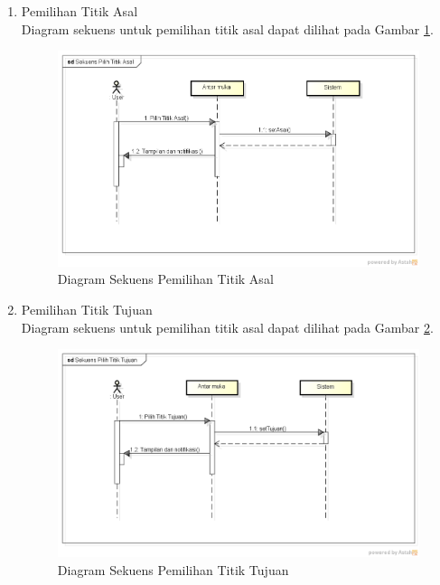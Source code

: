 \begin{enumerate}
  \item Pemilihan Titik Asal\\
  Diagram sekuens untuk pemilihan titik asal dapat dilihat pada Gambar
  \ref{fig:sd_titikAsal}.
\begin{figure}[h]
\centering
\includegraphics[scale=0.5]{Gambar/sd_titikAsal}
\caption[Diagram Sekuens Pemilihan Titik Asal]{Diagram Sekuens Pemilihan Titik
Asal}
\label{fig:sd_titikAsal}
\end{figure}
  
  \item Pemilihan Titik Tujuan\\
  Diagram sekuens untuk pemilihan titik asal dapat dilihat pada Gambar
  \ref{fig:sd_titikTujuan}.
\begin{figure}[H]
\centering
\includegraphics[scale=0.5]{Gambar/sd_titikTujuan}
\caption[Diagram Sekuens Pemilihan Titik Tujuan]{Diagram Sekuens Pemilihan Titik
Tujuan}
\label{fig:sd_titikTujuan}
\end{figure}
  

\end{enumerate}
